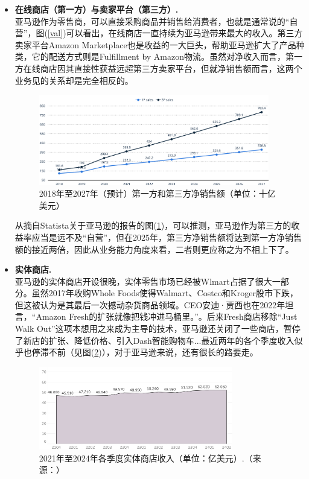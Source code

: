 \documentclass[12pt]{ctexart}
\begin{document}
\begin{itemize}
    \item \textbf{在线商店（第一方）与卖家平台（第三方）.} \\
    亚马逊作为零售商，可以直接采购商品并销售给消费者，也就是通常说的“自营”，图(\ref{val})可以看出，在线商店一直持续为亚马逊带来最大的收入。第三方卖家平台Amazon Marketplace也是收益的一大巨头，帮助亚马逊扩大了产品种类，它的配送方式则是Fulfillment by Amazon物流。虽然对净收入而言，第一方在线商店因其直接性获益远超第三方卖家平台，但就净销售额而言，这两个业务见的关系却是完全相反的。

    \begin{figure}[htbp!]
        \centering
        \includegraphics[width=0.95\textwidth]{Images/5.png}
        \caption{2018年至2027年（预计）第一方和第三方净销售额（单位：十亿美元）}
        \label{cut}
    \end{figure}

    从摘自Statista关于亚马逊的报告\cite{17}的图(\ref{cut})，可以推测，亚马逊作为第三方的收益率应当是远不及“自营”，但在2025年，第三方净销售额将达到第一方净销售额的接近两倍，因此从业务能力角度来看，二者则更应称之为不相上下了。
    
    \item \textbf{实体商店.} \\
    亚马逊的实体商店开设很晚，实体零售市场已经被Wlmart占据了很大一部分。虽然2017年收购Whole Foods使得Walmart、Costco和Kroger股市下跌，但这被认为是其最后一次撼动杂货商品领域\cite{18}。CEO安迪·贾西也在2022年坦言，“Amazon Fresh的扩张就像把钱冲进马桶里。”。后来Fresh商店移除“Just Walk Out”这项本想用之来成为主导的技术，亚马逊还关闭了一些商店，暂停了新店的扩张、降低价格、引入Dash智能购物车\cite{18}...最近两年的各个季度收入似乎也停滞不前（见图(\ref{rev})），对于亚马逊来说，还有很长的路要走。

    \begin{figure}[htbp!]
        \centering
        \includegraphics[width=0.8\textwidth]{Images/9.png}
        \caption{2021年至2024年各季度实体商店收入（单位：亿美元）.（来源：\cite{19}）}
        \label{rev}
    \end{figure}
    

\end{itemize}
\end{document}
